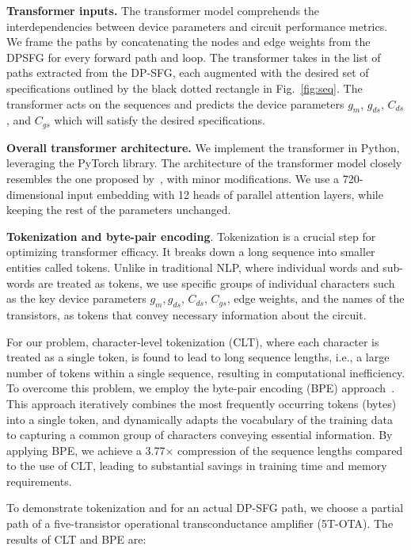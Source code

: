 \noindent
\textbf{Transformer inputs.} The transformer model comprehends the interdependencies between device parameters and circuit performance metrics. We frame the paths by concatenating the nodes and edge weights from the DPSFG for every forward path and loop. The transformer takes in the list of paths extracted from the DP-SFG, each augmented with the desired set of specifications outlined by the black dotted rectangle in Fig.~\ref{fig:seq}. The transformer acts on the sequences and predicts the device parameters $g_m$, $g_{ds}$, $C_{ds}$, and $C_{gs}$ which will satisfy the desired specifications.


\noindent
\textbf{Overall transformer architecture.}
We implement the transformer in Python, leveraging the PyTorch library. The architecture of the transformer model closely resembles the one proposed by~\cite{vaswani_17}, with minor modifications. We use a 720-dimensional input embedding with 12 heads of parallel attention layers, while keeping the rest of the parameters unchanged.

\noindent
\textbf{Tokenization and byte-pair encoding}.
Tokenization is a crucial step for optimizing transformer efficacy. It breaks down a long sequence into smaller entities called tokens. Unlike in traditional NLP, where individual words and sub-words are treated as tokens, we use specific groups of individual characters such as the key device parameters $g_m, g_{ds}$, $C_{ds}$, $C_{gs}$, edge weights, and the names of the transistors, as tokens that convey necessary information about the circuit. 

For our problem, character-level tokenization (CLT), where each character is treated as a single token, is found to lead to long sequence lengths, i.e., a large number of tokens within a single sequence, resulting in computational inefficiency.
To overcome this problem, we employ the byte-pair encoding (BPE) approach~\cite{rico_16}.
This approach iteratively combines the most frequently occurring tokens (bytes) into a single token,
and dynamically adapts the vocabulary of the training data to capturing a common group of characters conveying essential information. By applying BPE, we achieve a 3.77$\times$ compression of the sequence lengths compared to the use of CLT, 
leading to substantial savings in training time and memory requirements.

To demonstrate tokenization and for an actual DP-SFG path, we choose a partial path of a five-transistor operational transconductance amplifier (5T-OTA). The results of CLT and BPE are:

